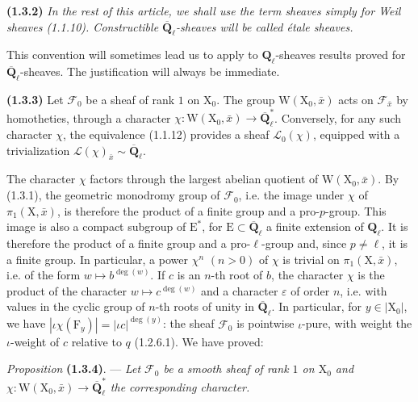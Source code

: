 \documentclass[11pt,leqno]{article}
\newcommand{\Page}[1]{\ifvmode\noindent\else\unskip\ \fi{\footnotesize\textcolor{gray}{[p.\,#1]}}\ \ignorespaces}
\begin{document}
\textbf{(1.3.2)} \textit{In the rest of this article, we shall use the term \textup{sheaves} simply for Weil sheaves \textup{(1.1.10)}. Constructible \(\overline{\mathbf{Q}}_\ell\)-sheaves will be called \textup{étale sheaves}.}

This convention will sometimes lead us to apply to \(\mathbf{Q}_\ell\)-sheaves results proved for \(\overline{\mathbf{Q}}_\ell\)-sheaves. The justification will always be immediate.

\textbf{(1.3.3)} Let \(\mathscr{F}_0\) be a sheaf of rank \(1\) on \(\mathrm{X}_0\). The group \(\mathrm{W}(\mathrm{X}_0,\bar{x})\) acts on \(\mathscr{F}_{\bar{x}}\) by homotheties, through a character \(\chi:\mathrm{W}(\mathrm{X}_0,\bar{x})\to\overline{\mathbf{Q}}_\ell^*\). Conversely, for any such character \(\chi\), the equivalence (1.1.12) provides a sheaf \(\mathscr{L}_0(\chi)\), equipped with a trivialization \(\mathscr{L}(\chi)_{\bar{x}}\sim\overline{\mathbf{Q}}_\ell\).

The character \(\chi\) factors through the largest abelian quotient of \(\mathrm{W}(\mathrm{X}_0,\bar{x})\). By (1.3.1), the geometric monodromy group of \(\mathscr{F}_0\), i.e. the image under \(\chi\) of \(\pi_1(\mathrm{X},\bar{x})\), is therefore the product of a finite group and a pro-\(p\)-group. This image is also a compact subgroup of \(\mathrm{E}^*\), for \(\mathrm{E}\subset\overline{\mathbf{Q}}_\ell\) a finite extension of \(\mathbf{Q}_\ell\). It is therefore the product of a finite group and a pro-\(\ell\)-group and, since \(p\ne\ell\), it is a finite group. In particular, a power \(\chi^n\) \((n>0)\) of \(\chi\) is trivial on \(\pi_1(\mathrm{X},\bar{x})\), i.e. of the form \(w\mapsto b^{\deg(w)}\).
If \(c\) is an \(n\)-th root of \(b\), the character \(\chi\) is the product of the character \(w\mapsto c^{\deg(w)}\) and a character \(\varepsilon\) of order \(n\), i.e. with values in the cyclic group of \(n\)-th roots of unity in \(\overline{\mathbf{Q}}_\ell\). In particular, for \(y\in|\mathrm{X}_0|\), we have \(|\iota\chi(\mathrm{F}_y)|=|\iota c|^{\deg(y)}\): the sheaf \(\mathscr{F}_0\) is pointwise \(\iota\)-pure, with weight the \(\iota\)-weight of \(c\) relative to \(q\) (1.2.6.1). We have proved:

\textit{Proposition} \textbf{(1.3.4)}. — \textit{Let \(\mathscr{F}_0\) be a smooth sheaf of rank \(1\) on \(\mathrm{X}_0\) and \(\chi:\mathrm{W}(\mathrm{X}_0,\bar{x})\to\overline{\mathbf{Q}}_\ell^*\) the corresponding character.}

\Page{158}
\end{document}
